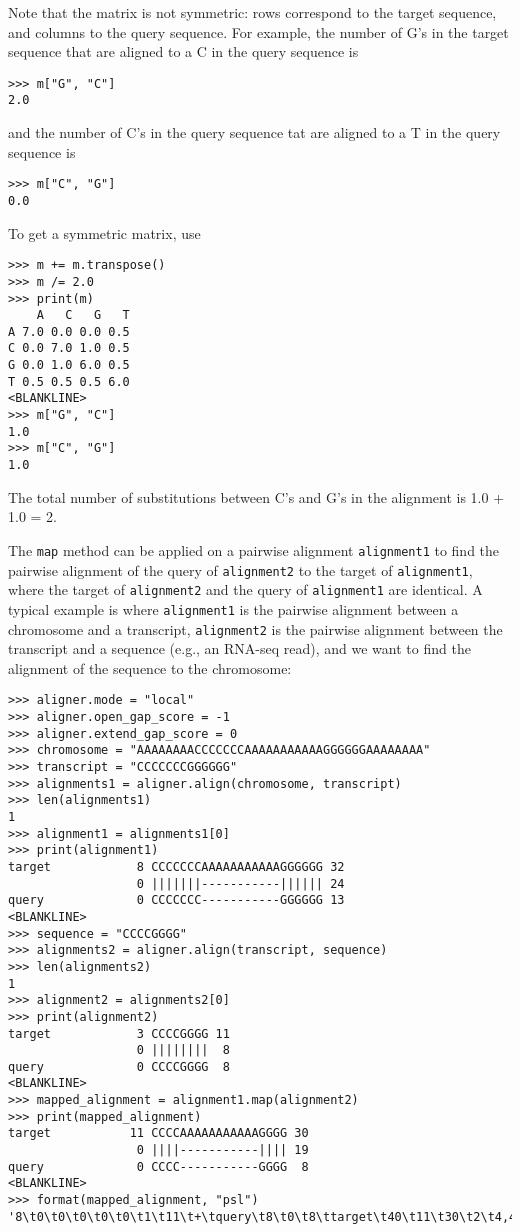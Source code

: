 Note that the matrix is not symmetric: rows correspond to the target sequence, and columns to the query sequence.  For example, the number of G's in the target sequence that are aligned to a C in the query sequence is
\begin{verbatim}
>>> m["G", "C"]
2.0
\end{verbatim}
and the number of C's in the query sequence tat are aligned to a T in the query sequence is
\begin{verbatim}
>>> m["C", "G"]
0.0
\end{verbatim}
To get a symmetric matrix, use
\begin{verbatim}
>>> m += m.transpose()
>>> m /= 2.0
>>> print(m)
    A   C   G   T
A 7.0 0.0 0.0 0.5
C 0.0 7.0 1.0 0.5
G 0.0 1.0 6.0 0.5
T 0.5 0.5 0.5 6.0
<BLANKLINE>
>>> m["G", "C"]
1.0
>>> m["C", "G"]
1.0
\end{verbatim}
The total number of substitutions between C's and G's in the alignment is 1.0 + 1.0 = 2.

The \verb+map+ method can be applied on a pairwise alignment \verb+alignment1+ to find the pairwise alignment of the query of \verb+alignment2+ to the target of \verb+alignment1+, where the target of \verb+alignment2+ and the query of \verb+alignment1+ are identical. A typical example is where \verb+alignment1+ is the pairwise alignment between a chromosome and a transcript, \verb+alignment2+ is the pairwise alignment between the transcript and a sequence (e.g., an RNA-seq read), and we want to find the alignment of the sequence to the chromosome:

\begin{verbatim}
>>> aligner.mode = "local"
>>> aligner.open_gap_score = -1
>>> aligner.extend_gap_score = 0
>>> chromosome = "AAAAAAAACCCCCCCAAAAAAAAAAAGGGGGGAAAAAAAA"
>>> transcript = "CCCCCCCGGGGGG"
>>> alignments1 = aligner.align(chromosome, transcript)
>>> len(alignments1)
1
>>> alignment1 = alignments1[0]
>>> print(alignment1)
target            8 CCCCCCCAAAAAAAAAAAGGGGGG 32
                  0 |||||||-----------|||||| 24
query             0 CCCCCCC-----------GGGGGG 13
<BLANKLINE>
>>> sequence = "CCCCGGGG"
>>> alignments2 = aligner.align(transcript, sequence)
>>> len(alignments2)
1
>>> alignment2 = alignments2[0]
>>> print(alignment2)
target            3 CCCCGGGG 11
                  0 ||||||||  8
query             0 CCCCGGGG  8
<BLANKLINE>
>>> mapped_alignment = alignment1.map(alignment2)
>>> print(mapped_alignment)
target           11 CCCCAAAAAAAAAAAGGGG 30
                  0 ||||-----------|||| 19
query             0 CCCC-----------GGGG  8
<BLANKLINE>
>>> format(mapped_alignment, "psl")
'8\t0\t0\t0\t0\t0\t1\t11\t+\tquery\t8\t0\t8\ttarget\t40\t11\t30\t2\t4,4,\t0,4,\t11,26,\n'
\end{verbatim}


